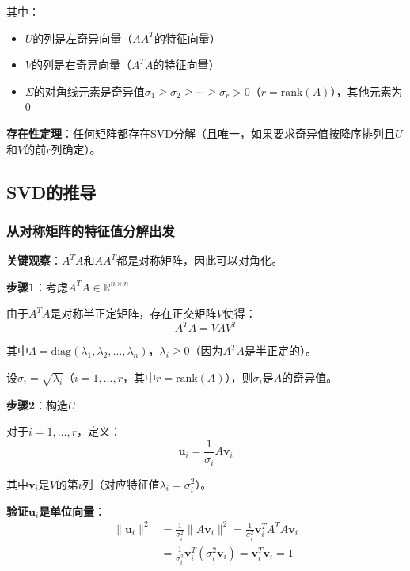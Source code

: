 \documentclass[12pt,a4paper]{article}
\begin{document}
其中：
\begin{itemize}
\item $U$的列是左奇异向量（$AA^T$的特征向量）
\item $V$的列是右奇异向量（$A^T A$的特征向量）
\item $\Sigma$的对角线元素是奇异值$\sigma_1 \geq \sigma_2 \geq \cdots \geq \sigma_r > 0$（$r = \text{rank}(A)$），其他元素为0
\end{itemize}

\textbf{存在性定理}：任何矩阵都存在SVD分解（且唯一，如果要求奇异值按降序排列且$U$和$V$的前$r$列确定）。

\subsection{SVD的推导}

\subsubsection{从对称矩阵的特征值分解出发}

\textbf{关键观察}：$A^T A$和$AA^T$都是对称矩阵，因此可以对角化。

\textbf{步骤1}：考虑$A^T A \in \mathbb{R}^{n \times n}$

由于$A^T A$是对称半正定矩阵，存在正交矩阵$V$使得：
\begin{equation}
A^T A = V \Lambda V^T
\end{equation}

其中$\Lambda = \text{diag}(\lambda_1, \lambda_2, \ldots, \lambda_n)$，$\lambda_i \geq 0$（因为$A^T A$是半正定的）。

设$\sigma_i = \sqrt{\lambda_i}$（$i = 1, \ldots, r$，其中$r = \text{rank}(A)$），则$\sigma_i$是$A$的奇异值。

\textbf{步骤2}：构造$U$

对于$i = 1, \ldots, r$，定义：
\begin{equation}
\bm{u}_i = \frac{1}{\sigma_i} A \bm{v}_i
\end{equation}

其中$\bm{v}_i$是$V$的第$i$列（对应特征值$\lambda_i = \sigma_i^2$）。

\textbf{验证$\bm{u}_i$是单位向量}：
\begin{align}
\|\bm{u}_i\|^2 &= \frac{1}{\sigma_i^2} \|A\bm{v}_i\|^2 = \frac{1}{\sigma_i^2} \bm{v}_i^T A^T A \bm{v}_i \\
&= \frac{1}{\sigma_i^2} \bm{v}_i^T (\sigma_i^2 \bm{v}_i) = \bm{v}_i^T \bm{v}_i = 1
\end{align}
\end{document}
